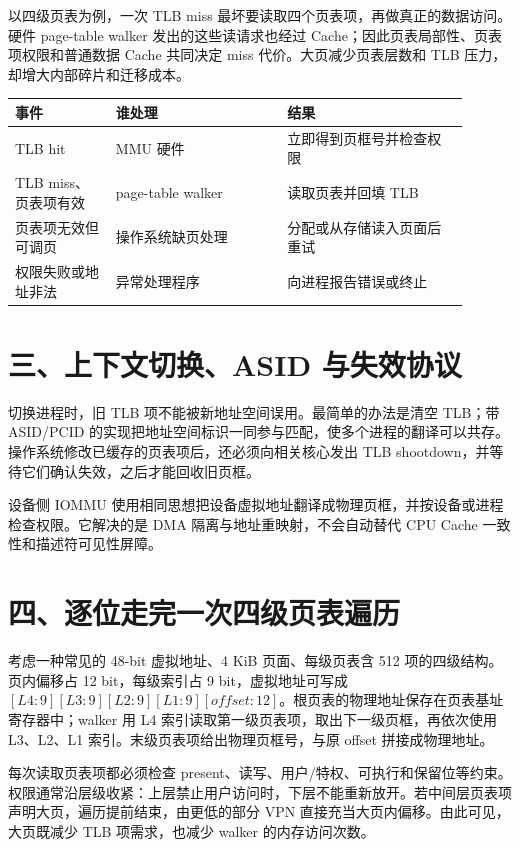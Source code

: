 以四级页表为例，一次 TLB miss 最坏要读取四个页表项，再做真正的数据访问。硬件 page-table walker 发出的这些读请求也经过 Cache；因此页表局部性、页表项权限和普通数据 Cache 共同决定 miss 代价。大页减少页表层数和 TLB 压力，却增大内部碎片和迁移成本。

\begin{longtable}{L{0.2\linewidth}L{0.34\linewidth}L{0.36\linewidth}}
\toprule
事件 & 谁处理 & 结果 \\
\midrule
TLB hit & MMU 硬件 & 立即得到页框号并检查权限 \\\tablerowrule
TLB miss、页表项有效 & page-table walker & 读取页表并回填 TLB \\\tablerowrule
页表项无效但可调页 & 操作系统缺页处理 & 分配或从存储读入页面后重试 \\\tablerowrule
权限失败或地址非法 & 异常处理程序 & 向进程报告错误或终止 \\
\bottomrule
\end{longtable}

\section{三、上下文切换、ASID 与失效协议}

切换进程时，旧 TLB 项不能被新地址空间误用。最简单的办法是清空 TLB；带 ASID/PCID 的实现把地址空间标识一同参与匹配，使多个进程的翻译可以共存。操作系统修改已缓存的页表项后，还必须向相关核心发出 TLB shootdown，并等待它们确认失效，之后才能回收旧页框。

设备侧 IOMMU 使用相同思想把设备虚拟地址翻译成物理页框，并按设备或进程检查权限。它解决的是 DMA 隔离与地址重映射，不会自动替代 CPU Cache 一致性和描述符可见性屏障。

\section{四、逐位走完一次四级页表遍历}

考虑一种常见的 48-bit 虚拟地址、4 KiB 页面、每级页表含 512 项的四级结构。页内偏移占 12 bit，每级索引占 9 bit，虚拟地址可写成 $[L4:9][L3:9][L2:9][L1:9][offset:12]$。根页表的物理地址保存在页表基址寄存器中；walker 用 L4 索引读取第一级页表项，取出下一级页框，再依次使用 L3、L2、L1 索引。末级页表项给出物理页框号，与原 offset 拼接成物理地址。

每次读取页表项都必须检查 present、读写、用户/特权、可执行和保留位等约束。权限通常沿层级收紧：上层禁止用户访问时，下层不能重新放开。若中间层页表项声明大页，遍历提前结束，由更低的部分 VPN 直接充当大页内偏移。由此可见，大页既减少 TLB 项需求，也减少 walker 的内存访问次数。


